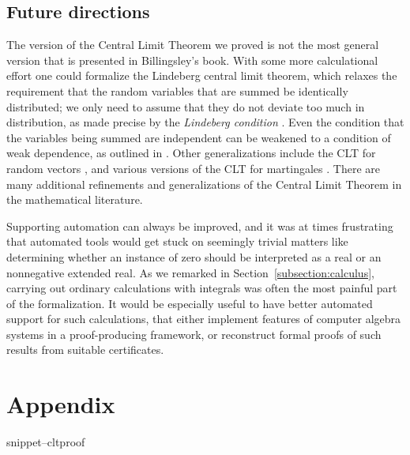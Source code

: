 \documentclass{svjour3}
\newcommand{\Snippet}[1]{\csname snippet--#1\endcsname}
\begin{document}
\subsection{Future directions}

The version of the Central Limit Theorem we proved is not the most general version that is presented in Billingsley's book. With some more calculational effort one could formalize the Lindeberg central limit theorem, which relaxes the requirement that the random variables that are summed be identically distributed; we only need to assume that they do not deviate too much in distribution, as made precise by the {\em Lindeberg condition} \cite[p.~359]{billingsley:95}. Even the condition that the variables being summed are independent can be weakened to a condition of weak dependence, as outlined in \cite[p.~363]{billingsley:95}. Other generalizations include the CLT for random vectors \cite[p.~385]{billingsley:95}, and various versions of the CLT for martingales \cite[pp.~475--478]{billingsley:95}. There are many additional refinements and generalizations of the Central Limit Theorem in the mathematical literature.

Supporting automation can always be improved, and it was at times frustrating that automated tools would get stuck on seemingly trivial matters like determining whether an instance of zero should be interpreted as a real or an nonnegative extended real. As we remarked in Section~\ref{subsection:calculus}, carrying out ordinary calculations with integrals was often the most painful part of the formalization. It would be especially useful to have better automated support for such calculations, that either implement features of computer algebra systems in a proof-producing framework, or reconstruct formal proofs of such results from suitable certificates.




\section*{Appendix}

\Snippet{cltproof}
\end{document}
